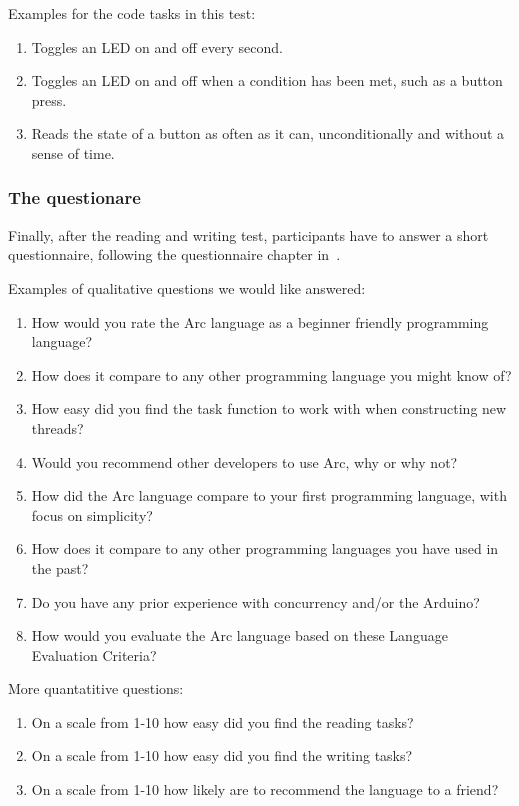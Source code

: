 Examples for the code tasks in this test:
\begin{enumerate}
    \item Toggles an LED on and off every second.
    \item Toggles an LED on and off when a condition has been met, such as a button press.
    \item Reads the state of a button as often as it can, unconditionally and without a sense of time.
\end{enumerate}

\subsubsection{The questionare}
Finally, after the reading and writing test, participants have to answer a short questionnaire, following the questionnaire chapter in~\cite[p.~146,~224-235]{benyon_2014}.

Examples of qualitative questions we would like answered: 

\begin{enumerate}
    \item How would you rate the Arc language as a beginner friendly programming language?
    \item How does it compare to any other programming language you might know of?
    \item How easy did you find the task function to work with when constructing new threads?
    \item Would you recommend other developers to use Arc, why or why not?
    \item How did the Arc language compare to your first programming language, with focus on simplicity?
    \item How does it compare to any other programming languages you have used in the past?
    \item Do you have any prior experience with concurrency and/or the Arduino?
    \item How would you evaluate the Arc language based on these Language Evaluation Criteria?
\end{enumerate}

More quantatitive questions: 
\begin{enumerate}
    \item On a scale from 1-10 how easy did you find the reading tasks?
    \item On a scale from 1-10 how easy did you find the writing tasks?
    \item On a scale from 1-10 how likely are to recommend the language to a friend?
\end{enumerate}

